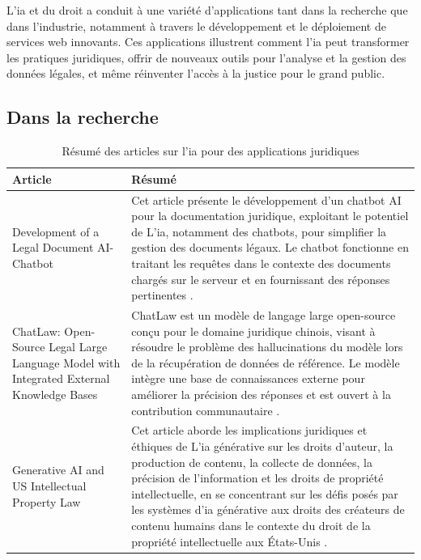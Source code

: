 L'\ac{ia} et du droit a conduit à une variété d'applications tant dans la recherche que dans l'industrie, notamment à travers le développement et le déploiement de services web innovants. Ces applications illustrent comment l'\ac{ia} peut transformer les pratiques juridiques, offrir de nouveaux outils pour l'analyse et la gestion des données légales, et même réinventer l'accès à la justice pour le grand public.

\newpage
\subsection{Dans la recherche}

\begin{table}[h]
\centering
\begin{tabular}{|m{}|m{}|}
\hline
\textbf{Article} & \textbf{Résumé} \\
\hline
Development of a Legal Document AI-Chatbot & Cet article présente le développement d'un chatbot AI pour la documentation juridique, exploitant le potentiel de L'\ac{ia}, notamment des chatbots, pour simplifier la gestion des documents légaux. Le chatbot fonctionne en traitant les requêtes dans le contexte des documents chargés sur le serveur et en fournissant des réponses pertinentes \cite{devaraj2023development}. \\
\hline
ChatLaw: Open-Source Legal Large Language Model with Integrated External Knowledge Bases & ChatLaw est un modèle de langage large open-source conçu pour le domaine juridique chinois, visant à résoudre le problème des hallucinations du modèle lors de la récupération de données de référence. Le modèle intègre une base de connaissances externe pour améliorer la précision des réponses et est ouvert à la contribution communautaire \cite{cui2023chatlaw}. \\
\hline
Generative AI and US Intellectual Property Law & Cet article aborde les implications juridiques et éthiques de L'\ac{ia} générative sur les droits d'auteur, la production de contenu, la collecte de données, la précision de l'information et les droits de propriété intellectuelle, en se concentrant sur les défis posés par les systèmes d'\ac{ia} générative aux droits des créateurs de contenu humains dans le contexte du droit de la propriété intellectuelle aux États-Unis \cite{poland2023generative}. \\
\hline
\end{tabular}
\caption{Résumé des articles sur l'\acf{ia} pour des applications juridiques}
\label{tab:law-article}
\end{table}

